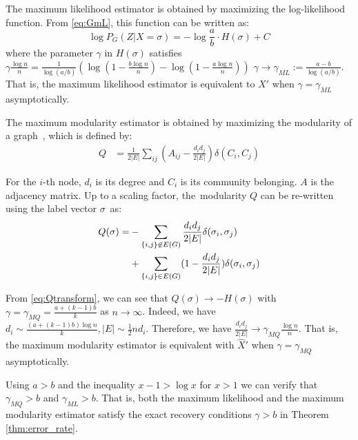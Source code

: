 \documentclass[entropy,article,accept,moreauthors,pdftex]{Definitions/mdpi}
\newcommand{\A}{\frac{a \log n}{n}}
\newcommand{\B}{\frac{b \log n}{n}}
\newcommand{\1}{\mathbbm{1}}
\begin{document}
\begin{paracol}{2}
The maximum likelihood estimator is obtained by maximizing the log-likelihood function.
From \eqref{eq:GmL}, this function can be written as:
$$
\log P_G(Z|X=\sigma) = -\log\frac{a}{b} \cdot H(\sigma) + C
$$
where the parameter $\gamma$ in $H(\sigma)$ satisfies \mbox{$\gamma \frac{\log n}{n} = \frac{1}{\log(a/b)}(\log (1-\B) - \log (1-\A))$}  \mbox{$\gamma \to \gamma_{ML} := \frac{a-b}{\log(a/b)}$}.
That is, the  maximum likelihood estimator is equivalent to $\hat{X}'$ when $\gamma = \gamma_{ML}$ asymptotically.


The maximum modularity estimator is obtained by maximizing the modularity of a graph~\cite{clauset2004finding}, which is defined by:
\begin{align}\label{eq:Q}
Q &= \frac{1}{2 |E|} \sum_{ij} (A_{ij} - \frac{d_i d_j}{2 |E|}) \delta(C_i, C_j)
\end{align}

For the $i$-th node, $d_i$ is its degree and $C_i$ is its community belonging. $A$ is the adjacency matrix.
Up to a scaling factor, the~modularity $Q$ can be re-written using the label vector $\sigma$~as:
\begin{align}
Q(\sigma) = &-\sum_{\{i,j\} \not\in E(G) } \frac{d_i d_j}{2 |E|}\delta(\sigma_i,\sigma_j) \notag \\
&+ \sum_{\{i,j\} \in E(G) } (1 - \frac{d_i d_j}{2 |E|}) \delta(\sigma_i,\sigma_j)  \label{eq:Qtransform}
\end{align}

From \eqref{eq:Qtransform}, we can see that $Q(\sigma) \to -H(\sigma)$ with $\gamma = \gamma_{MQ} = \frac{a+(k-1)b}{k}$ as $n\to \infty$.
Indeed, we have $d_i \sim \frac{(a+(k-1)b)\log n}{k}, |E| \sim \frac{1}{2}n d_i$. Therefore, we have $\frac{d_id_j}{2|E|} \to \gamma_{MQ} \frac{\log n}{n} $. That is, the maximum modularity estimator is equivalent with $\hat{X}'$ when $\gamma = \gamma_{MQ}$ asymptotically.


Using $a>b$ and the inequality $x-1>\log x $ for $x>1$ we can verify that $\gamma_{MQ} >b$ and  $\gamma_{ML} > b$. That is, both the maximum likelihood and the maximum modularity estimator satisfy the exact recovery conditions $\gamma > b $ in Theorem \ref{thm:error_rate}.



\end{paracol}
\end{document}
